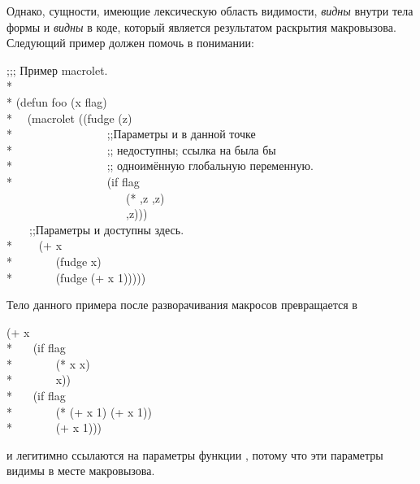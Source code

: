 \begin{defmac}
Однако, сущности, имеющие лексическую область видимости, \emph{видны} внутри
тела формы  и \emph{видны} в коде, который является результатом
раскрытия макровызова. Следующий пример должен помочь в понимании:
\begin{lisp}
;;; Пример macrolet. \\*
\\*
(defun foo (x flag) \\*
~~(macrolet ((fudge (z) \\*
~~~~~~~~~~~~~~~~;;\textrm{Параметры  и  в данной точке} \\*
~~~~~~~~~~~~~~~~;; \textrm{недоступны; ссылка на  была бы} \\*
~~~~~~~~~~~~~~~~;; \textrm{одноимённую глобальную переменную.} \\*
~~~~~~~~~~~~~~~~{\Xbq}(if flag \\
~~~~~~~~~~~~~~~~~~~~~(* ,z ,z) \\
~~~~~~~~~~~~~~~~~~~~~,z))) \\
~~~~;;\textrm{Параметры  и  доступны здесь.} \\*
~~~~(+ x \\*
~~~~~~~(fudge x) \\*
~~~~~~~(fudge (+ x 1)))))
\end{lisp}
Тело данного примера после разворачивания макросов превращается в
\begin{lisp}
(+ x \\*
~~~(if flag \\*
~~~~~~~(* x x) \\*
~~~~~~~x)) \\*
~~~(if flag \\*
~~~~~~~(* (+ x 1) (+ x 1)) \\*
~~~~~~~(+ x 1)))
\end{lisp}
 и  легитимно ссылаются на параметры функции
, потому что эти параметры видимы в месте макровызова.
\end{defmac}

